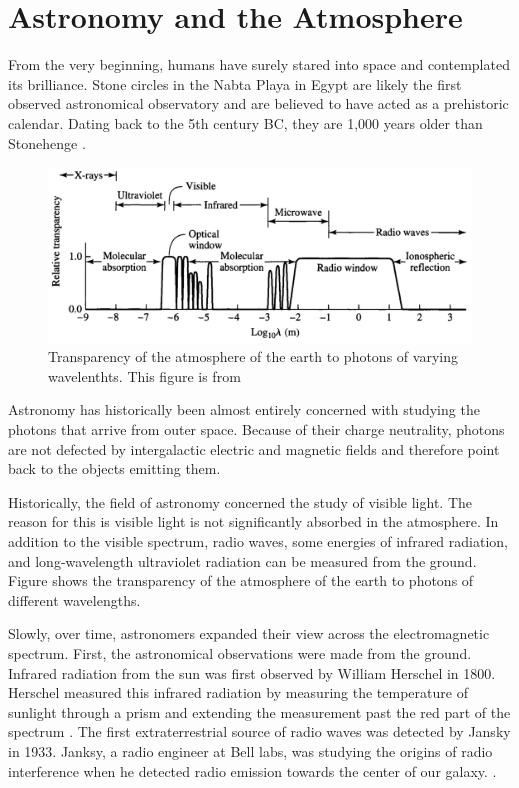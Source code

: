 \section{Astronomy and the Atmosphere}


From the very beginning, humans have surely stared into space and
contemplated its brilliance.  Stone circles in the Nabta Playa in
Egypt are likely the first observed astronomical observatory and
are believed to have acted as a prehistoric calendar.  Dating back
to the 5th century BC, they are 1,000 years older than Stonehenge
\citep{mck-mahille_2007_astronomy-nabta}.

\begin{figure}[htbp]
  \centering
  \includegraphics[width=\textwidth]{chapters/introduction/figures/atmospheric_absorption.pdf}
  \caption{
  Transparency of the atmosphere of the earth to photons of 
  varying wavelenthts.  This figure is from \cite{carroll_2006_introduction-modern}
  }
\end{figure}

Astronomy has historically been almost entirely concerned with studying
the photons that arrive from outer space.  Because of their charge
neutrality, photons are not defected by intergalactic electric and
magnetic fields and therefore point back to the objects 
emitting them. 

Historically, the field of astronomy concerned
the study of visible light. The reason for this is visible light
is not significantly absorbed in the atmosphere. 
In addition to the visible spectrum, radio waves, some
energies of infrared radiation, and long-wavelength ultraviolet
radiation can be measured from the ground. Figure
 shows the transparency
of the atmosphere of the earth to photons of different wavelengths.

Slowly, over time, astronomers expanded their view across the
electromagnetic spectrum.  First, the astronomical observations
were made from the ground.  Infrared radiation from the sun was
first observed by William Herschel in 1800. Herschel measured this
infrared radiation by measuring the temperature of sunlight through
a prism and extending the measurement past the red part of the
spectrum \citep{herschel_1800_experiments-refrangibility}.  The first
extraterrestrial source of radio waves was detected by Jansky in 1933.
Janksy, a radio engineer at Bell labs, was studying the
origins of radio interference when he detected radio emission towards
the center of our galaxy.
\citep{jansky_1933_electrical-disturbances}.

